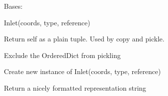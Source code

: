 \documentclass[a4paper,10pt,english]{sphinxmanual}
\begin{document}
\begin{fulllineitems}
\label{aqueduct.traj.inlets:aqueduct.traj.inlets.Inlet}
Bases: 

Inlet(coords, type, reference)

\begin{fulllineitems}
\label{aqueduct.traj.inlets:aqueduct.traj.inlets.Inlet.__getnewargs__}
Return self as a plain tuple.  Used by copy and pickle.

\end{fulllineitems}


\begin{fulllineitems}
\label{aqueduct.traj.inlets:aqueduct.traj.inlets.Inlet.__getstate__}
Exclude the OrderedDict from pickling

\end{fulllineitems}


\begin{fulllineitems}
\label{aqueduct.traj.inlets:aqueduct.traj.inlets.Inlet.__new__}
Create new instance of Inlet(coords, type, reference)

\end{fulllineitems}


\begin{fulllineitems}
\label{aqueduct.traj.inlets:aqueduct.traj.inlets.Inlet.__repr__}
Return a nicely formatted representation string

\end{fulllineitems}


\begin{fulllineitems}
\label{aqueduct.traj.inlets:aqueduct.traj.inlets.Inlet.__slots__}
\end{fulllineitems}



\end{fulllineitems}
\end{document}
